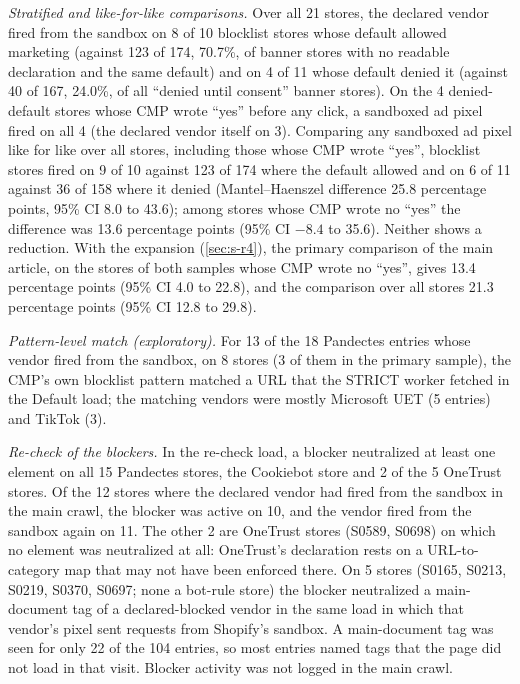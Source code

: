 \documentclass[preprint,11pt,authoryear,a4paper]{elsarticle}
\begin{document}
\emph{Stratified and like-for-like comparisons.} Over all 21 stores, the declared vendor fired from the sandbox on 8 of 10 blocklist stores whose default allowed marketing (against 123 of 174, 70.7\%, of banner stores with no readable declaration and the same default) and on 4 of 11 whose default denied it (against 40 of 167, 24.0\%, of all ``denied until consent'' banner stores). On the 4 denied-default stores whose CMP wrote ``yes'' before any click, a sandboxed ad pixel fired on all 4 (the declared vendor itself on 3). Comparing any sandboxed ad pixel like for like over all stores, including those whose CMP wrote ``yes'', blocklist stores fired on 9 of 10 against 123 of 174 where the default allowed and on 6 of 11 against 36 of 158 where it denied (Mantel--Haenszel difference 25.8 percentage points, 95\% CI 8.0 to 43.6); among stores whose CMP wrote no ``yes'' the difference was 13.6 percentage points (95\% CI $-8.4$ to 35.6). Neither shows a reduction. With the expansion (\ref{sec:s-r4}), the primary comparison of the main article, on the stores of both samples whose CMP wrote no ``yes'', gives 13.4 percentage points (95\% CI 4.0 to 22.8), and the comparison over all stores 21.3 percentage points (95\% CI 12.8 to 29.8).

\emph{Pattern-level match (exploratory).} For 13 of the 18 Pandectes entries whose vendor fired from the sandbox, on 8 stores (3 of them in the primary sample), the CMP's own blocklist pattern matched a URL that the STRICT worker fetched in the Default load; the matching vendors were mostly Microsoft UET (5 entries) and TikTok (3).

\emph{Re-check of the blockers.} In the re-check load, a blocker neutralized at least one element on all 15 Pandectes stores, the Cookiebot store and 2 of the 5 OneTrust stores. Of the 12 stores where the declared vendor had fired from the sandbox in the main crawl, the blocker was active on 10, and the vendor fired from the sandbox again on 11. The other 2 are OneTrust stores (S0589, S0698) on which no element was neutralized at all: OneTrust's declaration rests on a URL-to-category map that may not have been enforced there. On 5 stores (S0165, S0213, S0219, S0370, S0697; none a bot-rule store) the blocker neutralized a main-document tag of a declared-blocked vendor in the same load in which that vendor's pixel sent requests from Shopify's sandbox. A main-document tag was seen for only 22 of the 104 entries, so most entries named tags that the page did not load in that visit. Blocker activity was not logged in the main crawl.
\end{document}
